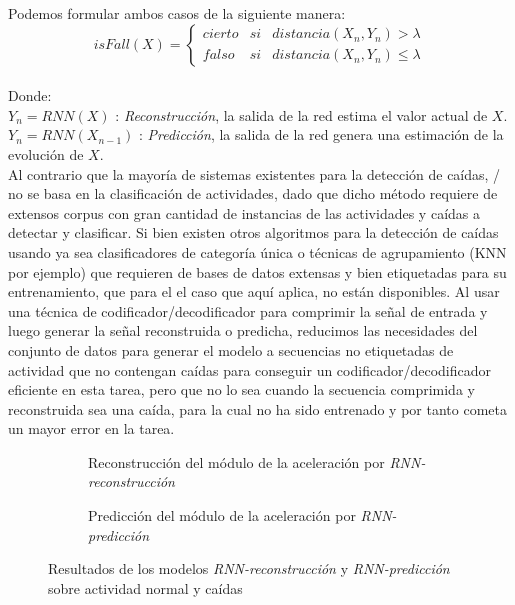 Podemos formular ambos casos de la siguiente manera:
\[
  isFall(X)=\left\{
    \begin{array}{lcl}
      cierto & si & distancia(X_n,Y_n) > \lambda \\
      falso & si & distancia(X_n,Y_n) \leq  \lambda
    \end{array}
    \right.
\]
\\
Donde:\\
$Y_n = RNN(X)$ : \textsl{Reconstrucción}, la salida de la red estima el valor actual de $X$.\\
$Y_n = RNN(X_{n-1})$ : \textsl{Predicción}, la salida de la red genera una estimación de la evolución de $X$.\\

Al contrario que la mayoría de sistemas existentes para la detección de caídas, \ifell/ no se basa en la clasificación de actividades, dado que dicho método requiere de extensos corpus con gran cantidad de instancias de las actividades y caídas a detectar y clasificar. Si bien existen otros algoritmos  para la detección de caídas usando ya sea clasificadores de categoría única o técnicas de agrupamiento (KNN por ejemplo) que requieren de bases de datos extensas y bien etiquetadas para su entrenamiento, que para el el caso que aquí aplica, no están disponibles. Al usar una técnica de codificador/decodificador para comprimir la señal de entrada y luego generar la señal reconstruida o predicha, reducimos las necesidades del conjunto de datos para generar el modelo a secuencias no etiquetadas de actividad que no contengan caídas para conseguir un codificador/decodificador eficiente en esta tarea, pero que no lo sea cuando la secuencia comprimida y reconstruida sea una caída, para la cual no ha sido entrenado y por tanto cometa un mayor error en la tarea.

\begin{figure}[!ht]
  \centering
  \begin{subfigure}[b]{0.45\textwidth}
      \centering
      \caption{\footnotesize \footnotesize \label{fig:reconstruccionAceleracion}Reconstrucción del módulo de la aceleración por \textit{RNN-reconstrucción}}
  \end{subfigure}
  \hfill
  \begin{subfigure}[b]{0.45\textwidth}
      \centering
      \caption{\footnotesize \footnotesize \label{fig:prediccionAceleracion}Predicción del módulo de la aceleración por \textit{RNN-predicción}}
  \end{subfigure}
  \caption{\label{fig:predict:vs:reconst} Resultados de los modelos \textit{RNN-reconstrucción} y \textit{RNN-predicción} sobre actividad normal y caídas}
\end{figure}

